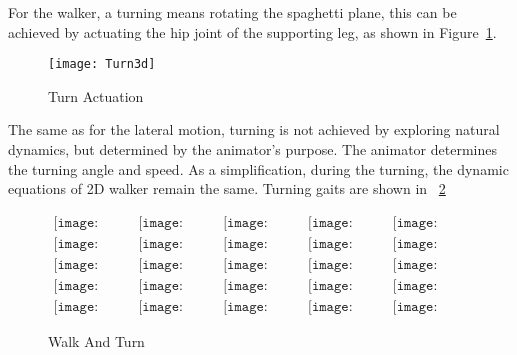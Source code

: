 For the walker,  a turning means rotating the spaghetti plane, this can be achieved by actuating the  hip joint of the supporting leg, as shown in Figure~\ref{fig:turn}.


\begin{figure}[!htbp]
  \begin{center}
      \texttt{[image: Turn3d]}
    \caption{Turn Actuation}
    \label{fig:turn}
\end{center}
\end{figure}


The same as for the lateral motion, turning is not achieved by exploring  natural dynamics, but determined by the animator's purpose.
The animator determines the turning angle and speed.
As a simplification, during the turning, the dynamic equations of 2D walker remain the same.
Turning gaits are shown in ~\ref{fig:walkturn}





\begin{figure}[!htbp]
  \begin{center}
  $
     \begin{array}{ccccc}
\texttt{[image: turn/0001.eps]}&
\texttt{[image: turn/0201.eps]}&
\texttt{[image: turn/0301.eps]}&
\texttt{[image: turn/0401.eps]}&
\texttt{[image: turn/0501.eps]}
\\
\texttt{[image: turn/0601.eps]}&
\texttt{[image: turn/0701.eps]}&
\texttt{[image: turn/0801.eps]}&
\texttt{[image: turn/0901.eps]}&
\texttt{[image: turn/1001.eps]}
\\
\texttt{[image: turn/1101.eps]}&
\texttt{[image: turn/1201.eps]}&
\texttt{[image: turn/1301.eps]}&
\texttt{[image: turn/1401.eps]}&
\texttt{[image: turn/1501.eps]}
\\
\texttt{[image: turn/1601.eps]}&
\texttt{[image: turn/1701.eps]}&
\texttt{[image: turn/1801.eps]}&
\texttt{[image: turn/1901.eps]}&
\texttt{[image: turn/2001.eps]}
\\
\texttt{[image: turn/2101.eps]}&
\texttt{[image: turn/2201.eps]}&
\texttt{[image: turn/2301.eps]}&
\texttt{[image: turn/2401.eps]}&
\texttt{[image: turn/2501.eps]}

\end{array}$
    \caption{Walk And Turn}
    \label{fig:walkturn}
\end{center}
\end{figure}





